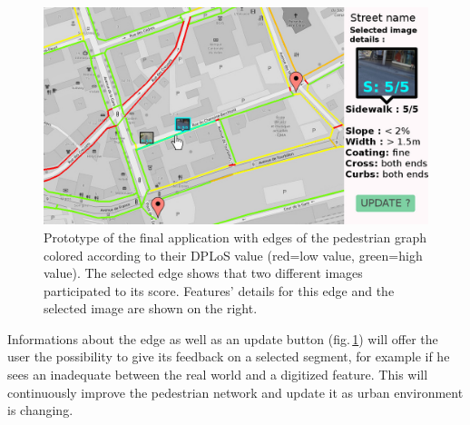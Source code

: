 \documentclass[10pt,conference,a4paper]{IEEEtran}
\begin{document}
\begin{figure}[ht]
\begin{center}
\includegraphics[width=1.0\linewidth]{example01.jpg}
\end{center}
   \caption{Prototype of the final application with edges of the pedestrian graph colored according to their DPLoS value (red=low value, green=high value). The selected edge shows that two different images participated to its score. Features' details for this edge and the selected image are shown on the right.}\label{finalapp}
\end{figure}



Informations about the edge as well as an update button (fig.\,\ref{finalapp}) will offer the user the possibility to give its feedback on a selected segment, for example if he sees an inadequate between the real world and a digitized feature. This will continuously improve the pedestrian network and update it as urban environment is changing.








\end{document}

